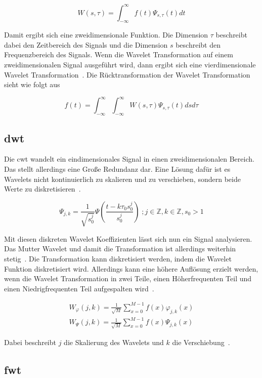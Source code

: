 \documentclass[12pt, a4paper, ngerman]{article}
\begin{document}
\[
  W(s,\tau)=\int_{-\infty}^{\infty}f(t)\Psi_{s,\tau}(t)dt
\]

Damit ergibt sich eine zweidimensionale Funktion.
Die Dimension \(\tau\) beschreibt dabei den Zeitbereich des Signals
und die Dimension \(s\) beschreibt den Frequenzbereich des Signals.
Wenn die Wavelet Transformation auf einem zweidimensionalen Signal ausgeführt wird,
dann ergibt sich eine vierdimensionale Wavelet Transformation~\cite[S.6]{friendly_wavelet}.
Die Rücktransformation der Wavelet Transformation sieht wie folgt aus~\cite[S.5]{friendly_wavelet}

\[
  f(t)=\int_{-\infty}^{\infty}\int_{-\infty}^{\infty}W(s,\tau)\Psi_{s,\tau}(t)dsd\tau
\]

\subsection{\acl{dwt}}

Die \ac{cwt} wandelt ein eindimensionales Signal
in einen zweidimensionalen Bereich.
Das stellt allerdings eine Große Redundanz dar.
Eine Lösung dafür ist es Wavelets nicht kontinuierlich
zu skalieren und zu verschieben, sondern beide Werte zu diskretisieren~\cite[S.8]{friendly_wavelet}.

\[
  \Psi_{j,k}=\frac{1}{\sqrt{s_0^j}}\Psi(\frac{t-k\tau_0s_0^j}{s_0^j})\;;j\in\mathbb{Z},k\in\mathbb{Z},s_0>1
\]

Mit diesen diskreten Wavelet Koeffizienten lässt sich nun ein Signal analysieren.
Das Mutter Wavelet und damit die Transformation ist allerdings weiterhin stetig~\cite[S.8]{friendly_wavelet}.
Die Transformation kann diskretisiert werden,
indem die Wavelet Funktion diskretisiert wird.
Allerdings kann eine höhere Auflösung erzielt werden,
wenn die Wavelet Transformation in zwei Teile,
einen Höherfrequenten Teil und einen Niedrigfrequenten Teil
aufgespalten wird~\cite[S.14]{friendly_wavelet}.

\[
  \begin{array}{c}
    W_\varphi(j,k) = \frac{1}{\sqrt{M}}\sum_{x=0}^{M-1}f(x)\varphi_{j,k}(x) \\
    W_\Psi(j,k) = \frac{1}{\sqrt{M}}\sum_{x=0}^{M-1}f(x)\Psi_{j,k}(x)
  \end{array}
\]

Dabei beschreibt \(j\) die Skalierung des Wavelets
und \(k\) die Verschiebung~\cite[S.9]{wavelet_analysis}.

\subsection{\acl{fwt}}
\end{document}
